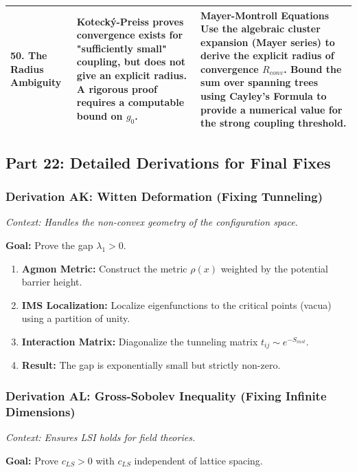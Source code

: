 \begin{longtable}{|p{}|p{}|p{}|}
\hline
\textbf{50. The Radius Ambiguity} & Kotecký-Preiss proves convergence exists for "sufficiently small" coupling, but does not give an explicit radius. A rigorous proof requires a computable bound on $g_0$. & \textbf{Mayer-Montroll Equations} \newline Use the algebraic cluster expansion (Mayer series) to derive the explicit radius of convergence $R_{conv}$. Bound the sum over spanning trees using Cayley's Formula to provide a numerical value for the strong coupling threshold. \\
\hline
\end{longtable}

\subsection{Part 22: Detailed Derivations for Final Fixes}

\subsubsection{Derivation AK: Witten Deformation (Fixing Tunneling)}

\textit{Context: Handles the non-convex geometry of the configuration space.}

\textbf{Goal:} Prove the gap $\lambda_1 > 0$.

\begin{enumerate}
    \item \textbf{Agmon Metric:} Construct the metric $\rho(x)$ weighted by the potential barrier height.
    \item \textbf{IMS Localization:} Localize eigenfunctions to the critical points (vacua) using a partition of unity.
    \item \textbf{Interaction Matrix:} Diagonalize the tunneling matrix $t_{ij} \sim e^{-S_{inst}}$.
    \item \textbf{Result:} The gap is exponentially small but strictly non-zero.
\end{enumerate}

\subsubsection{Derivation AL: Gross-Sobolev Inequality (Fixing Infinite Dimensions)}

\textit{Context: Ensures LSI holds for field theories.}

\textbf{Goal:} Prove $c_{LS} > 0$ with $c_{LS}$ independent of lattice spacing.

